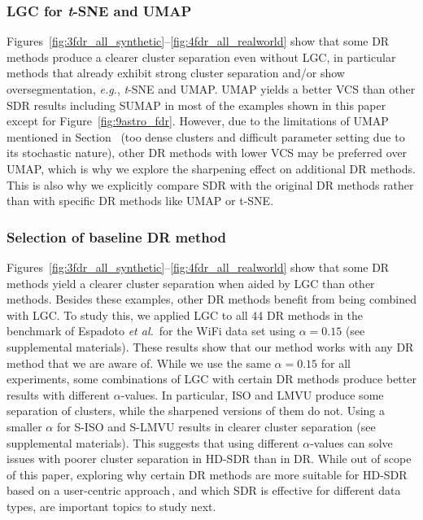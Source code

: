 \documentclass[sagev,Afour,times]{sagej}
\begin{document}
\subsubsection{LGC for \emph{t}-SNE and UMAP}
%
Figures~\ref{fig:3fdr_all_synthetic}--\ref{fig:4fdr_all_realworld} show that some DR methods produce a clearer cluster separation even without LGC, in particular methods that already exhibit strong cluster separation and/or show oversegmentation, \emph{e.g.}, \emph{t}-SNE and UMAP. UMAP yields a better VCS than other SDR results including SUMAP in most of the examples shown in this paper except for Figure~\ref{fig:9astro_fdr}. However, due to the limitations of UMAP mentioned in Section~ (too dense clusters and difficult parameter setting due to its stochastic nature), other DR methods with lower VCS may be preferred over UMAP, which is why we explore the sharpening effect on additional DR methods. This is also why we explicitly compare SDR with the original DR methods rather than with specific DR methods like UMAP or t-SNE.

\subsubsection{Selection of baseline DR method}
%
Figures~\ref{fig:3fdr_all_synthetic}--\ref{fig:4fdr_all_realworld} show that some DR methods yield a clearer cluster separation when aided by LGC than other methods. Besides these examples, other DR methods benefit from being combined with LGC. To study this, we applied LGC to all 44 DR methods in the benchmark of Espadoto \emph{et al.}\,\cite{mateusDR_survey2019} for the WiFi data set using $\alpha=0.15$ (see supplemental materials). These results show that our method works with any DR method that we are aware of. While we use the same $\alpha=0.15$ for all experiments, some combinations of LGC with certain DR methods produce better results with different $\alpha$-values. In particular, ISO and LMVU produce some separation of clusters, while the sharpened versions of them do not. Using a smaller $\alpha$ for S-ISO and S-LMVU results in clearer cluster separation (see supplemental materials). This suggests that using different $\alpha$-values can solve issues with poorer cluster separation in HD-SDR than in DR. While out of scope of this paper, exploring why certain DR methods are more suitable for HD-SDR based on a user-centric approach\,\cite{perceptionChooseDR_userstudy2}, and which SDR is effective for different data types, are important topics to study next.
\end{document}
